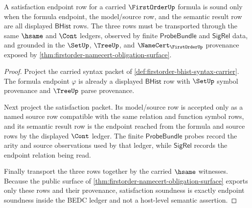 \begin{theorem}\label{thm:firstorder-satisfaction-endpoint-soundness}
A satisfaction endpoint row for a carried $\FirstOrderUp$ formula is sound
only when the formula endpoint, the model/source row, and the semantic result
row are all displayed $\mathsf{BHist}$ rows. The three rows must be transported
through the same $\hsame$ and $\Cont$ ledgers, observed by finite
$\mathsf{ProbeBundle}$ and $\mathsf{SigRel}$ data, and grounded in the
$\SetUp$, $\TreeUp$, and $\NameCert_{\FirstOrderUp}$ provenance exposed by
\autoref{thm:firstorder-namecert-obligation-surface}.
\end{theorem}
\begin{proof}
Project the carried syntax packet of
\autoref{def:firstorder-bhist-syntax-carrier}. The formula endpoint
$\varphi$ is already a displayed $\mathsf{BHist}$ row with $\SetUp$ symbol
provenance and $\TreeUp$ parse provenance.

Next project the satisfaction packet. Its model/source row is accepted only
as a named source row compatible with the same relation and function symbol
rows, and its semantic result row is the endpoint reached from the formula
and source rows by the displayed $\Cont$ ledger. The finite
$\mathsf{ProbeBundle}$ probes record the arity and source observations used
by that ledger, while $\mathsf{SigRel}$ records the endpoint relation being
read.

Finally transport the three rows together by the carried $\hsame$ witnesses.
Because the public surface of
\autoref{thm:firstorder-namecert-obligation-surface} exports only these rows
and their provenance, satisfaction soundness is exactly endpoint soundness
inside the BEDC ledger and not a host-level semantic assertion.
\end{proof}

